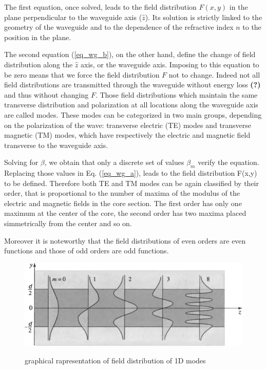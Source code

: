 \documentclass[12pt,a4paper,twoside]{article}
\begin{document}
The first equation, once solved, leads to the field distribution $F(x,y)$ in the plane perpendicular to the waveguide axis ($\hat{z}$).
Its solution is strictly linked to the geometry of the waveguide and to the dependence of the refractive index $n$ to the position in the plane.

The second equation (\ref{eq_wg_b}), on the other hand, define the change of field distribution along the $\hat{z}$ axis, or the waveguide axis.
Imposing to this equation to be zero means that we force the field distribution $F$ not to change.
Indeed not all field distributions are transmitted through the waveguide without energy loss \textbf{(?)} and thus without changing $F$.
Those field distributions which maintain the same transverse distribution and polarization at all locations along the waveguide axis are called modes.
These modes can be categorized in two main groups, depending on the polarization of the wave: transverse electric (TE) modes and transverse magnetic (TM) modes, which have respectively the electric and magnetic field transverse to the waveguide axis.

Solving for $\beta$, we obtain that only a discrete set of values $\beta_m$ verify the equation.
Replacing those values in Eq. (\ref{eq_wg_a}), leads to the field distribution F(x,y) to be defined.
Therefore both TE and TM modes can be again classified by their order, that is proportional to the number of maxima of the modulus of the electric and magnetic fields in the core section.
The first order has only one maximum at the center of the core, the second order has two maxima placed simmetrically from the center and so on.

Moreover it is noteworthy that the field distributions of even orders are even functions and those of odd orders are odd functions.

\begin{figure}[ht]
	\centering
	\includegraphics[width=.75\textwidth]{1D_fields.png}
	\label{fig_1dmodes}
	\caption{graphical rapresentation of field distribution of 1D modes}
\end{figure}
\end{document}
